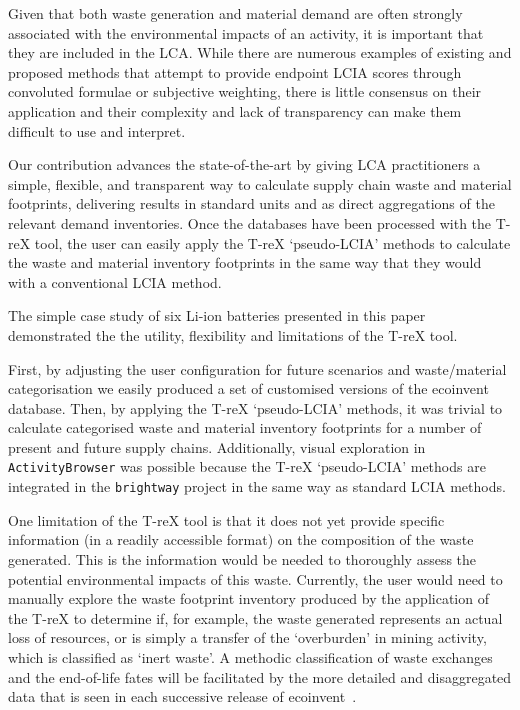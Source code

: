 Given that both waste generation and material demand are often strongly associated with the environmental impacts of an activity, it is important that they are included in the LCA. While there are numerous examples of existing and proposed methods that attempt to provide endpoint LCIA scores through convoluted formulae or subjective weighting, there is little consensus on their application and their complexity and lack of transparency can make them difficult to use and interpret.

Our contribution advances the state-of-the-art by giving LCA practitioners a simple, flexible, and transparent way to calculate supply chain waste and material footprints, delivering results in standard units and as direct aggregations of the relevant demand inventories. Once the databases have been processed with the T-reX tool, the user can  easily apply the T-reX `pseudo-LCIA' methods to calculate the waste and material inventory footprints in the same way that they would with a conventional LCIA method.

The simple case study of six Li-ion batteries presented in this paper demonstrated the the utility, flexibility and limitations of the T-reX tool. 

First, by adjusting the user configuration for future scenarios and waste/material categorisation we easily produced a set of customised versions of the ecoinvent database. Then, by applying the T-reX `pseudo-LCIA' methods, it was trivial to calculate categorised waste and material inventory footprints for a number of present and future supply chains. Additionally, visual exploration in \texttt{ActivityBrowser} was possible because the T-reX `pseudo-LCIA' methods are integrated in the \texttt{brightway} project in the same way as standard LCIA methods.

One limitation of the T-reX tool is that it does not yet provide specific information (in a readily accessible format) on the composition of the waste generated. This is the information would be needed to thoroughly assess the potential environmental impacts of this waste. Currently, the user would need to manually explore the waste footprint inventory produced by the application of the T-reX to determine if, for example, the waste generated represents an actual loss of resources, or is simply a transfer of the `overburden' in mining activity, which is classified as `inert waste'. A methodic classification of waste exchanges and the end-of-life fates will be facilitated by the more detailed and disaggregated data that is seen in each successive release of ecoinvent~\citep{fitzgerald2023ecoinventdocumentation}.

